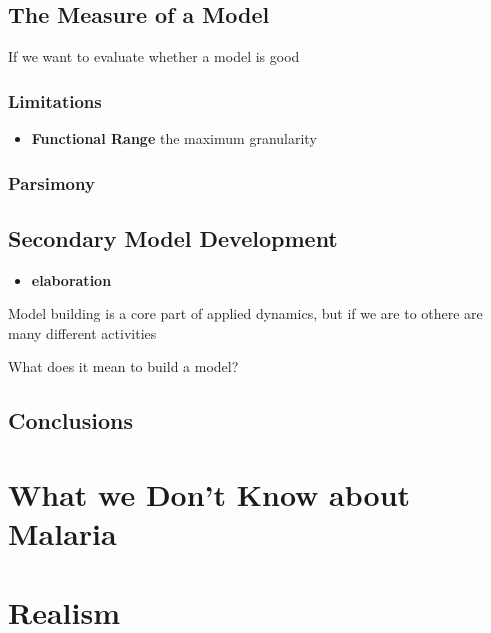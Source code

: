 \documentclass[
]{book}
\providecommand{\tightlist}{%
  \setlength{\itemsep}{0pt}\setlength{\parskip}{0pt}}
\begin{document}
\section{The Measure of a Model}\label{the-measure-of-a-model}

If we want to evaluate whether a model is good

\subsection{Limitations}\label{limitations}

\begin{itemize}
\tightlist
\item
  \textbf{Functional Range} the maximum granularity
\end{itemize}

\subsection{Parsimony}\label{parsimony}

\section{Secondary Model Development}\label{secondary-model-development}

\begin{itemize}
\tightlist
\item
  \textbf{elaboration}
\end{itemize}

Model building is a core part of applied dynamics, but if we are to othere are many different activities

What does it mean to build a model?

\section{Conclusions}\label{conclusions}

\chapter{What we Don't Know about Malaria}\label{what-we-dont-know-about-malaria}

\section{}\label{section}

\chapter{Realism}\label{realism}
\end{document}
